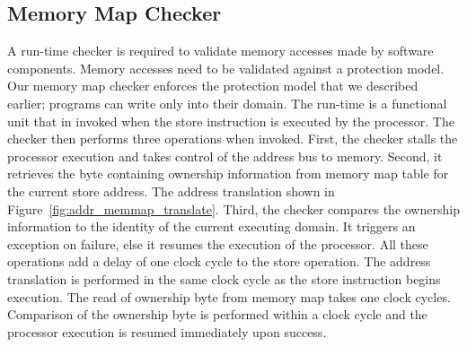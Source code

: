 \subsection{Memory Map Checker}
%
A run-time checker is required to validate memory accesses made by software components.
%
Memory accesses need to be validated against a protection model.
%
Our memory map checker enforces the protection model that we described earlier; programs can write only into their domain.
%
%
The run-time is a functional unit that in invoked when the store instruction is executed by the processor.
%
The checker then performs three operations when invoked.
%
First, the checker stalls the processor execution and takes control of the address bus to memory.
%
Second, it retrieves the byte containing ownership information from memory map table for the current store address.
%
The address translation shown in Figure~\ref{fig:addr_memmap_translate}.%
%
%
Third, the checker compares the ownership information to the identity of the current executing domain.
%
It triggers an exception on failure, else it resumes the execution of the processor.
%
All these operations add a delay of one clock cycle to the store operation.
%
The address translation is performed in the same clock cycle as the store instruction begins execution.
%
The read of ownership byte from memory map takes one clock cycles.
%
Comparison of the ownership byte is performed within a clock cycle and the processor execution is resumed immediately upon success.
%

